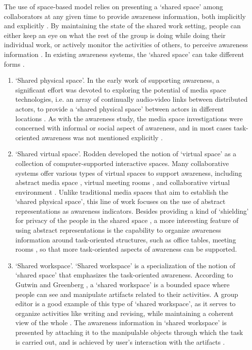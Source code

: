The use of space-based model relies on presenting a `shared space' among collaborators at any given time to provide awareness information, both implicitly and explicitly \cite{dourish1992awareness}. By maintaining the state of the shared work setting, people can either keep an eye on what the rest of the group is doing while doing their individual work, or actively monitor the activities of others, to perceive awareness information \cite{simone2002a}. 
In existing awareness systems, the `shared space' can take different forms \cite{antunes2010a}. 
\begin{enumerate}
   \item `Shared physical space'. In the early work of supporting awareness, a significant effort was devoted to exploring the potential of media space technologies, i.e. an array of continually audio-video links between distributed actors, to provide a `shared physical space' between actors in different locations \cite{Dourish1992}. As with the awareness study, the media space investigations were concerned with informal or social aspect of awareness, and in most cases task-oriented awareness was not mentioned explicitly \cite{schmidt2002a}.
   \item `Shared virtual space'. Rodden \cite{Rodden1996} developed the notion of `virtual space' as a collection of computer-supported interactive spaces. Many collaborative systems offer various types of virtual spaces to support awareness, including abstract media space \cite{Pedersen1997}, virtual meeting rooms \cite{Berlage1999}, and collaborative virtual environment \cite{Benford2001}. Unlike traditional media spaces that aim to establish the `shared physical space', this line of work focuses on the use of abstract representations as awareness indicators. Besides providing a kind of `shielding' for privacy of the people in the shared space \cite{Pedersen1997}, a more interesting feature of using abstract representations is the capability to organize awareness information around task-oriented structures, such as office tables, meeting rooms \cite{Berlage1999}, so that more task-oriented aspects of awareness can be supported.
   \item `Shared workspace'. `Shared workspace' is a specialization of the notion of `shared space' that emphasizes the task-oriented awareness. According to Gutwin and Greenberg \cite{Gutwin2002}, a `shared workspace' is a bounded space where people can see and manipulate artifacts related to their activities. A group editor is a good example of this type of `shared workspace', as it serves to organize activities like writing and revising, while maintaining a coherent view of the whole \cite{dourish1992awareness}. The awareness information in `shared workspace' is presented by attaching it to the manipulable objects through which the task is carried out, and is achieved by user's interaction with the artifacts \cite{Gutwin2002}.
\end{enumerate}

